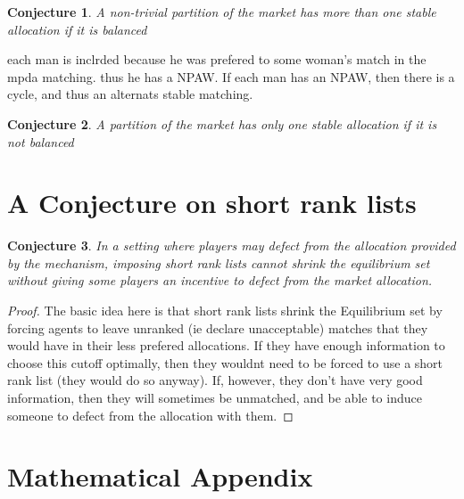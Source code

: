 \documentclass[WP]{AEA}
\newtheorem{conj}{Conjecture}
\begin{document}
\begin{conj}
	A non-trivial partition of the market has more than one stable allocation if it is balanced
\end{conj}
	each man is inclrded because he was prefered to some woman's match in the mpda matching.  thus he has a NPAW.  If each man has an NPAW, then there is a cycle, and thus an alternats stable matching.
\begin{conj}
		A partition of the market has only one stable allocation if it is not balanced
\end{conj}
	

\section{A Conjecture on short rank lists}
\begin{conj}
	 In a setting where players may defect from the allocation provided by the mechanism, imposing short rank lists cannot shrink the equilibrium set without giving some players an incentive to defect from the market allocation.
\end{conj}
\begin{proof}
	The basic idea here is that short rank lists shrink the Equilibrium set by forcing agents to leave unranked (ie declare unacceptable) matches that they would have in their less prefered allocations.  If they have enough information to choose this cutoff optimally, then they wouldnt need to be forced to use a short rank list (they would do so anyway).  If, however, they don't have very good information, then they will sometimes be unmatched, and be able to induce someone to defect from the allocation with them. 
\end{proof}




\appendix



\section{Mathematical Appendix}
\end{document}
